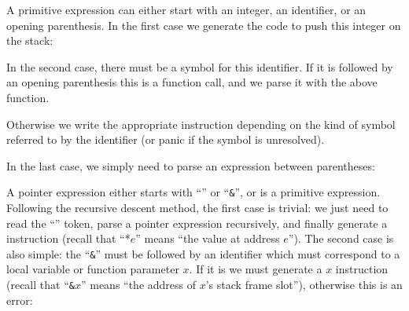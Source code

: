 
A primitive expression can either start with an integer, an identifier, or an
opening parenthesis. In the first case we generate the code to push this
integer on the stack:


In the second case, there must be a symbol for this identifier. If it is
followed by an opening parenthesis this is a function call, and we parse it
with the above function.


\noindent Otherwise we write the appropriate instruction depending on the kind
of symbol referred to by the identifier (or panic if the symbol is unresolved).


In the last case, we simply need to parse an expression between parentheses:


A pointer expression either starts with ``{\tt *}'' or ``{\tt \&}'', or is a
primitive expression. Following the recursive descent method, the first case is
trivial: we just need to read the ``{\tt *}'' token, parse a pointer expression
recursively, and finally generate a  instruction (recall that
``*$e$'' means ``the value at address $e$''). The second case is also simple:
the ``{\tt \&}'' must be followed by an identifier which must correspond to a
local variable or function parameter $x$. If it is we must generate a
 $x$ instruction (recall that ``{\tt \&$x$}'' means ``the address of
$x$'s stack frame slot''), otherwise this is an error:

